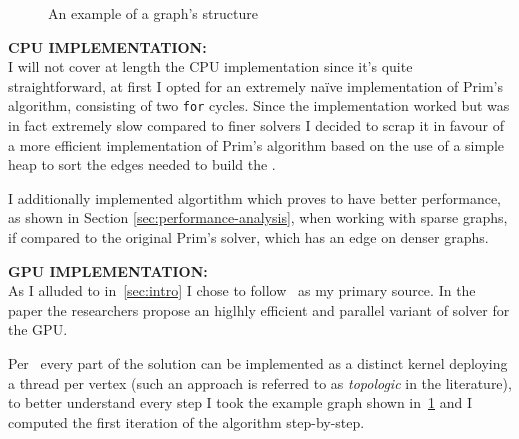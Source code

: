 \documentclass[a4paper,10pt]{article}
\begin{document}
\begin{figure}
	\centering
	
	\caption{An example of a graph's \csr structure}
	\label{tikz:csr-struct}
\end{figure}

\bigskip
{}
\makeatletter{}\makeatother\label{sec:cpu-implementation}
\noindent
\textbf{CPU IMPLEMENTATION:}
\\
I will not cover at length the CPU implementation since it's quite straightforward, at first I opted
for an extremely na\"ive implementation of Prim's algorithm, consisting of two \texttt{for} cycles.
Since the implementation worked but was in fact extremely slow compared to finer solvers I
decided to scrap it in favour of a more efficient implementation of Prim's algorithm based on
the use of a simple heap to sort the edges needed to build the \mst.

I additionally implemented \brkas algortithm which proves to have better performance, as shown in Section \ref{sec:performance-analysis}, when working with sparse graphs, if compared to the original Prim's solver, which has an edge on denser graphs.

\bigskip
{}
\makeatletter\def\@currentlabel{\texttt{(IV)}}\makeatother\label{sec:gpu-implementation}
\noindent
\textbf{GPU IMPLEMENTATION:}
\\
As I alluded to in~\ref{sec:intro} I chose to follow~\cite{generic-he-boruvka} as my primary source. In the paper the researchers propose an higlhly efficient and parallel variant of \brkas solver for the GPU.

Per~\cite{generic-he-boruvka} every part of the solution can be implemented as a distinct kernel
deploying a thread per vertex (such an approach is referred to as \textit{topologic} in the
literature), to better understand every step I took the example graph shown in~\ref{tikz:csr-struct} and I computed the first iteration of the algorithm step-by-step.
\end{document}
